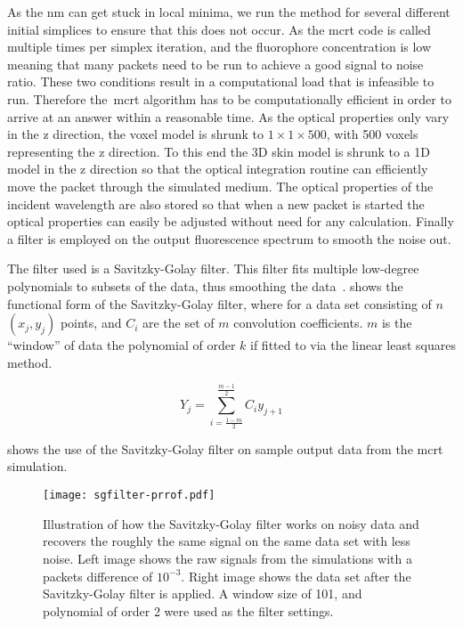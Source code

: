 As the \gls*{nm} can get stuck in local minima, we run the method for several different initial simplices to ensure that this does not occur.
As the \gls*{mcrt} code is called multiple times per simplex iteration, and the fluorophore concentration is low meaning that many packets need to be run to achieve a good signal to noise ratio.
These two conditions result in a computational load that is infeasible to run. 
Therefore the~\gls*{mcrt} algorithm has to be computationally efficient in order to arrive at an answer within a reasonable time.
As the optical properties only vary in the z direction, the voxel model is shrunk to $1 \times 1 \times 500$, with 500 voxels representing the z direction.
To this end the 3D skin model is shrunk to a 1D model in the z direction so that the optical integration routine can efficiently move the packet through the simulated medium.
The optical properties of the incident wavelength are also stored so that when a new packet is started the optical properties can easily be adjusted without need for any calculation.
Finally a filter is employed on the output fluorescence spectrum to smooth the noise out.

The filter used is a Savitzky-Golay filter.
This filter fits multiple low-degree polynomials to subsets of the data, thus smoothing the data~\cite{press1990savitzky}. 
 shows the functional form of the Savitzky-Golay filter, where for a data set consisting of $n$ $(x_j,y_j)$ points, and $C_i$ are the set of $m$ convolution coefficients.
$m$ is the ``window'' of data the polynomial of order $k$ if fitted to via the linear least squares method.

\begin{equation}
Y_j=\sum\limits_{i=\tfrac{1-m}{2}}^{\tfrac{m-1}{2}}C_i y_{j+1}\label{eqn:svgfiltereqn}
\end{equation}

 shows the use of the Savitzky-Golay filter on sample output data from the \gls*{mcrt} simulation.

\begin{figure}[!htbp]
  \centering
  \texttt{[image: sgfilter-prrof.pdf]}
  \caption{Illustration of how the Savitzky-Golay filter works on noisy data and recovers the roughly the same signal on the same data set with less noise. Left image shows the raw signals from the simulations with a packets difference of $10^{-3}$. Right image shows the data set after the Savitzky-Golay filter is applied. A window size of 101, and polynomial of order 2 were used as the filter settings.}
  \label{fig:sgfilter}
\end{figure}


